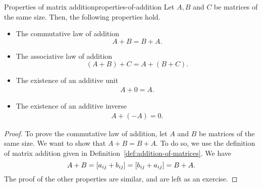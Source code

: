 \begin{theorem}{Properties of matrix addition}{properties-of-addition}
  Let $A,B$ and $C$ be matrices of the same size. Then, the following
  properties%
   hold.

  \begin{itemize}
  \item The commutative law of addition
    \begin{equation*}
      A+B=B+A.
    \end{equation*}
  \item The associative law of addition
    \begin{equation*}
      (A+B)+C=A+(B+C).
    \end{equation*}
  \item The existence of an additive unit
    \begin{equation*}
      \begin{array}{c}
        A+0=A.
      \end{array}
    \end{equation*}
  \item The existence of an additive inverse
    \begin{equation*}
      \begin{array}{c}
        A+(-A) = 0.
      \end{array}
    \end{equation*}
  \end{itemize}
\end{theorem}

\begin{proof}
  To prove the commutative law of addition, let $A$ and $B$ be
  matrices of the same size. We want to show that $A+B=B+A$. To do so,
  we use the definition of matrix addition given in Definition~\ref{def:addition-of-matrices}.  We have
  \begin{equation*}
    A+B = \left[a_{ij}+b_{ij}\right] = \left[b_{ij}+a_{ij}\right] = B+A.
  \end{equation*}
  The proof of the other properties are similar, and are left as an
  exercise.
\end{proof}
